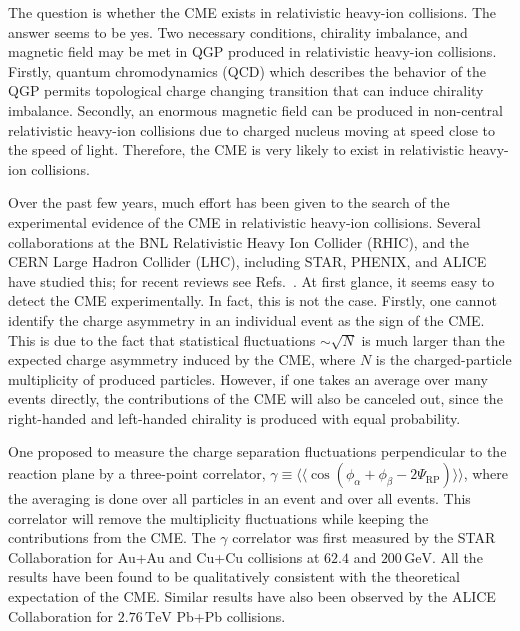\documentclass[preprint]{elsarticle}
\begin{document}
The question is whether the CME exists in relativistic heavy-ion collisions. The answer seems to be yes. Two necessary conditions, chirality imbalance, and magnetic field may be met in QGP produced in relativistic heavy-ion collisions. Firstly, quantum chromodynamics (QCD) which describes the behavior of the QGP permits topological charge changing transition that can induce chirality imbalance\cite{Kharzeev:2007jp}. Secondly, an enormous magnetic field can be produced in non-central relativistic heavy-ion collisions due to charged nucleus moving at speed close to the speed of light\cite{Skokov:2009qp,Voronyuk:2011jd,Bzdak:2011yy,Deng:2012pc,Tuchin:2013apa,Mo:2013qya}. Therefore, the CME is very likely to exist in relativistic heavy-ion collisions.

Over the past few years, much effort has been given to the search of the experimental evidence of the CME in relativistic heavy-ion collisions. Several collaborations at the BNL Relativistic Heavy Ion Collider (RHIC), and the CERN Large Hadron Collider (LHC), including STAR\cite{Abelev2009ac, Abelev:2009ad, Voloshin:2008jx, PhysRevC.88.064911, Wang:2012qs, Adamczyk:2014mzf, Adamczyk:2013kcb}, PHENIX\cite{Ajitanand:2010}, and ALICE\cite{Christakoglou:2011uqg,PhysRevLett.110.012301} have studied this; for recent reviews see Refs.~\cite{Wang:2016mkm}.
At first glance, it seems easy to detect the CME experimentally. In fact, this is not the case. Firstly, one cannot identify the charge asymmetry in an individual event as the sign of the CME. This is due to the fact that statistical fluctuations $\sim \sqrt{N}$ is much larger than the expected charge asymmetry induced by the CME, where $N$ is the charged-particle multiplicity of produced particles\cite{Kharzeev:2007jp}. However, if one takes an average over many events directly, the contributions of the CME will also be canceled out, since the right-handed and left-handed chirality is produced with equal probability.

One proposed to measure the charge separation fluctuations perpendicular to the reaction plane by a three-point correlator, $\gamma \equiv \langle \langle \cos(\phi_\alpha + \phi_\beta - 2 \Psi_\text{RP}) \rangle \rangle$, where the averaging is done over all particles in an event and over all events\cite{Voloshin:2004vk,Kharzeev:2007jp}. This correlator will remove the multiplicity fluctuations while keeping the contributions from the CME. The $\gamma$ correlator was first measured by the STAR Collaboration for Au+Au and Cu+Cu collisions at $62.4$ and $200\,\mathrm{GeV}$\cite{Abelev2009ac,Abelev:2009ad}. All the results have been found to be qualitatively consistent with the theoretical expectation of the CME. Similar results have also been observed by the ALICE Collaboration for $2.76\,\mathrm{TeV}$ Pb+Pb collisions\cite{PhysRevLett.110.012301}.
\end{document}
